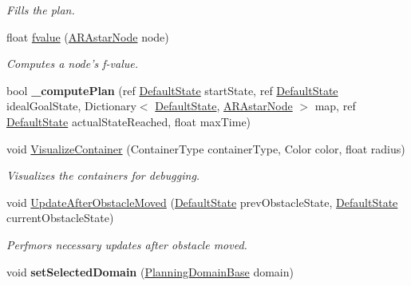 \begin{DoxyCompactItemize}
\begin{DoxyCompactList}\small\item\em Fills the plan. \end{DoxyCompactList}\item 
float \hyperlink{class_a_r_astar_planner_a006ae9bee4b3f93f82e79d4e103553ad}{fvalue} (\hyperlink{class_a_r_astar_node}{A\-R\-Astar\-Node} node)
\begin{DoxyCompactList}\small\item\em Computes a node's f-\/value. \end{DoxyCompactList}\item 
\hypertarget{class_a_r_astar_planner_ad129d7fbfc86b727772647edcaa62bce}{bool {\bfseries \-\_\-compute\-Plan} (ref \hyperlink{class_default_state}{Default\-State} start\-State, ref \hyperlink{class_default_state}{Default\-State} ideal\-Goal\-State, Dictionary$<$ \hyperlink{class_default_state}{Default\-State}, \hyperlink{class_a_r_astar_node}{A\-R\-Astar\-Node} $>$ map, ref \hyperlink{class_default_state}{Default\-State} actual\-State\-Reached, float max\-Time)}\label{class_a_r_astar_planner_ad129d7fbfc86b727772647edcaa62bce}

\item 
void \hyperlink{class_a_r_astar_planner_a61d4f2f23e1515ef5a9eaa74924ac447}{Visualize\-Container} (Container\-Type container\-Type, Color color, float radius)
\begin{DoxyCompactList}\small\item\em Visualizes the containers for debugging. \end{DoxyCompactList}\item 
void \hyperlink{class_a_r_astar_planner_a11fccda58571dcb091da9babda39ebd6}{Update\-After\-Obstacle\-Moved} (\hyperlink{class_default_state}{Default\-State} prev\-Obstacle\-State, \hyperlink{class_default_state}{Default\-State} current\-Obstacle\-State)
\begin{DoxyCompactList}\small\item\em Perfmors necessary updates after obstacle moved. \end{DoxyCompactList}\item 
\hypertarget{class_a_r_astar_planner_afb83f1df56770d7eab8f26498d00b8b6}{void {\bfseries set\-Selected\-Domain} (\hyperlink{class_planning_domain_base}{Planning\-Domain\-Base} domain)}\label{class_a_r_astar_planner_afb83f1df56770d7eab8f26498d00b8b6}


\end{DoxyCompactItemize}
